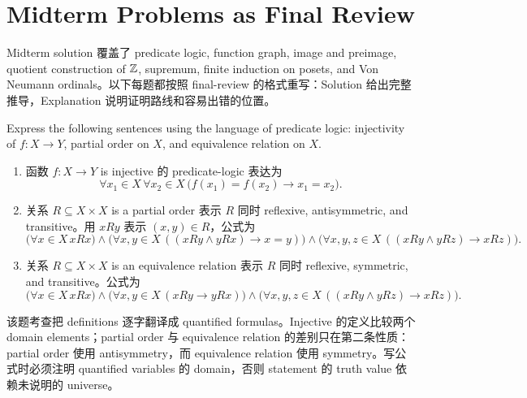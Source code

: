 \chapter{Midterm Problems as Final Review}
\label{chap:midterm-review}

Midterm solution 覆盖了 predicate logic, function graph, image and preimage, quotient construction of \(\mathbb{Z}\), supremum, finite induction on posets, and Von Neumann ordinals。以下每题都按照 final-review 的格式重写：Solution 给出完整推导，Explanation 说明证明路线和容易出错的位置。

\begin{exerciseblock}
Express the following sentences using the language of predicate logic: injectivity of \(f:X\to Y\), partial order on \(X\), and equivalence relation on \(X\).
\end{exerciseblock}

\begin{solution}
\begin{enumerate}[label=(\alph*)]
  \item 函数 \(f:X\to Y\) is injective 的 predicate-logic 表达为
  \[
    \forall x_1\in X\,\forall x_2\in X\,
    \bigl(f(x_1)=f(x_2)\to x_1=x_2\bigr).
  \]
  \item 关系 \(R\subseteq X\times X\) is a partial order 表示 \(R\) 同时 reflexive, antisymmetric, and transitive。用 \(xRy\) 表示 \((x,y)\in R\)，公式为
  \[
  \bigl(\forall x\in X\, xRx\bigr)
  \land
  \bigl(\forall x,y\in X\,((xRy\land yRx)\to x=y)\bigr)
  \land
  \bigl(\forall x,y,z\in X\,((xRy\land yRz)\to xRz)\bigr).
  \]
  \item 关系 \(R\subseteq X\times X\) is an equivalence relation 表示 \(R\) 同时 reflexive, symmetric, and transitive。公式为
  \[
  \bigl(\forall x\in X\, xRx\bigr)
  \land
  \bigl(\forall x,y\in X\,(xRy\to yRx)\bigr)
  \land
  \bigl(\forall x,y,z\in X\,((xRy\land yRz)\to xRz)\bigr).
  \]
\end{enumerate}
\end{solution}

\begin{explanation}
该题考查把 definitions 逐字翻译成 quantified formulas。Injective 的定义比较两个 domain elements；partial order 与 equivalence relation 的差别只在第二条性质：partial order 使用 antisymmetry，而 equivalence relation 使用 symmetry。写公式时必须注明 quantified variables 的 domain，否则 statement 的 truth value 依赖未说明的 universe。
\end{explanation}

